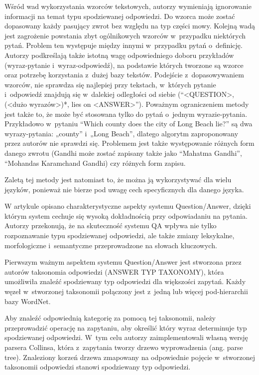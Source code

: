 Wśród wad wykorzystania wzorców tekstowych, autorzy wymieniają ignorowanie informacji na temat typu spodziewanej odpowiedzi. Do wzorca może zostać dopasowany każdy pasujący zwrot bez względu na typ części mowy. Kolejną wadą jest zagrożenie powstania zbyt ogólnikowych wzorców w~przypadku niektórych pytań. Problem ten występuje między innymi w~przypadku pytań o~definicję. Autorzy podkreślają także istotną wagę odpowiedniego doboru przykładów (wyraz-pytanie i~wyraz-odpowiedź), na podstawie których tworzone są wzorce oraz potrzebę korzystania z~dużej bazy tekstów. Podejście z~dopasowywaniem wzorców, nie sprawdza się najlepiej przy tekstach, w~których pytanie i~odpowiedź znajdują się w~dalekiej odległości od siebie (“<QUESTION>, (<dużo wyrazów>)*, lies on <ANSWER>”). Poważnym ograniczeniem metody jest także to, że może być stosowana tylko do pytań o~jednym wyrazie-pytania. Przykładowo w~pytaniu “Which county does the city of Long Beach lie?” są dwa wyrazy-pytania: „county” i~„Long Beach”, dlatego algorytm zaproponowany przez autorów nie sprawdzi się. Problemem jest także występowanie różnych form danego zwrotu (Gandhi może zostać zapisany także jako “Mahatma Gandhi”, “Mohandas Karamchand Gandhi) czy różnych form zapisu. 

Zaletą tej metody jest natomiast to, że można ją wykorzystywać dla wielu języków, ponieważ nie bierze pod uwagę cech specyficznych dla danego języka\cite{ravichandran-hovy-2002-learning}.

W artykule \cite{hpqa} opisano charakterystyczne aspekty systemu Question/Answer, dzięki którym system cechuje się wysoką dokładnością przy odpowiadaniu na pytania. Autorzy przekonują, że na skuteczność systemu QA wpływa nie tylko rozpoznawanie typu spodziewanej odpowiedzi, ale także zmiany leksykalne, morfologiczne i~semantyczne przeprowadzone na słowach kluczowych.

Pierwszym ważnym aspektem systemu Question/Answer jest stworzona przez autorów taksonomia odpowiedzi (ANSWER TYP TAXONOMY), która umożliwiła znaleźć spodziewany typ odpowiedzi dla większości zapytań. Każdy węzeł w~stworzonej taksonomii połączony jest z~jedną lub więcej pod-hierarchii bazy WordNet. 

Aby znaleźć odpowiednią kategorię za pomocą tej taksonomii, należy przeprowadzić operację na zapytaniu, aby określić który wyraz determinuje typ spodziewanej odpowiedzi. W~tym celu autorzy zaimplementowali własną wersję parsera Collinsa, która z~zapytania tworzy drzewo wyprowadzenia (ang. parse tree). Znaleziony korzeń drzewa zmapowany na odpowiednie pojęcie w~stworzonej taksonomii odpowiedzi stanowi spodziewany typ odpowiedzi. 


